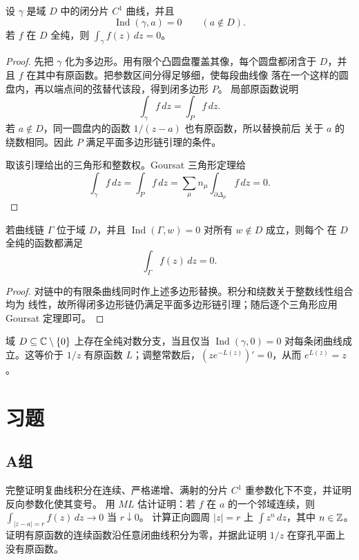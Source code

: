 \begin{theorem}
\label{thm:cauchy-winding-condition}
设 \(\gamma\) 是域 \(D\) 中的闭分片 \(C^1\) 曲线，并且
\[
 \operatorname{Ind}(\gamma,a)=0\qquad(a\notin D).
\]
若 \(f\) 在 \(D\) 全纯，则 \(\int_\gamma f(z)\,dz=0\)。
\end{theorem}

\begin{proof}
先把 \(\gamma\) 化为多边形。用有限个凸圆盘覆盖其像，每个圆盘都闭含于
\(D\)，并且 \(f\) 在其中有原函数。把参数区间分得足够细，使每段曲线像
落在一个这样的圆盘内，再以端点间的弦替代该段，得到闭多边形 \(P\)。
局部原函数说明
\[
 \int_\gamma f\,dz=\int_P f\,dz.
\]
若 \(a\notin D\)，同一圆盘内的函数 \(1/(z-a)\) 也有原函数，所以替换前后
关于 \(a\) 的绕数相同。因此 \(P\) 满足平面多边形链引理的条件。

取该引理给出的三角形和整数权。Goursat 三角形定理给
\[
 \int_\gamma f\,dz
 =\int_P f\,dz
 =\sum_\mu n_\mu\int_{\partial\Delta_\mu}f\,dz
 =0.
\]
\end{proof}

\begin{corollary}
\label{cor:cauchy-cycle-form}
若曲线链 \(\Gamma\) 位于域 \(D\)，并且
\(\operatorname{Ind}(\Gamma,w)=0\) 对所有 \(w\notin D\) 成立，则每个
在 \(D\) 全纯的函数都满足
\[
 \int_\Gamma f(z)\,dz=0.
\]
\end{corollary}

\begin{proof}
对链中的有限条曲线同时作上述多边形替换。积分和绕数关于整数线性组合均为
线性，故所得闭多边形链仍满足平面多边形链引理；随后逐个三角形应用
Goursat 定理即可。
\end{proof}

域 \(D\subseteq\mathbb{C}\setminus\{0\}\) 上存在全纯对数分支，当且仅当
\(\operatorname{Ind}(\gamma,0)=0\) 对每条闭曲线成立。这等价于 \(1/z\)
有原函数 \(L\)；调整常数后，\((ze^{-L(z)})'=0\)，从而 \(e^{L(z)}=z\)。

\section*{习题}
\subsection*{A组}
\begin{enumerate}[label=\textbf{\thechapter.\arabic*.}]
完整证明复曲线积分在连续、严格递增、满射的分片 \(C^1\) 重参数化下不变，并证明反向参数化使其变号。
用 \(ML\) 估计证明：若 \(f\) 在 \(a\) 的一个邻域连续，则 \(\int_{|z-a|=r}f(z)\,dz\to0\) 当 \(r\downarrow0\)。
计算正向圆周 \(|z|=r\) 上 \(\int z^n\,dz\)，其中 \(n\in\mathbb{Z}\)。
证明有原函数的连续函数沿任意闭曲线积分为零，并据此证明 \(1/z\) 在穿孔平面上没有原函数。
\end{enumerate}
